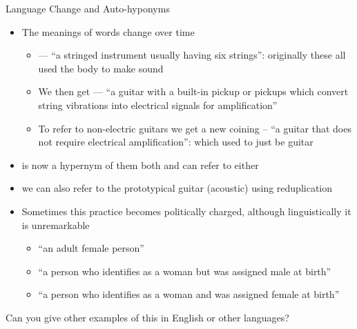 \begin{frame}[allowframebreaks]{Language Change and Auto-hyponyms}

\begin{itemize}%
\item The meanings of words change over time
  \begin{itemize}
  \item {} --- ``a stringed instrument usually having six
    strings'': originally these all used the body to make sound
    
\item We then get  --- ``a guitar with a built-in
  pickup or pickups which convert string vibrations into electrical
  signals for amplification''
\item To refer to non-electric guitars we get a new coining
   -- ``a guitar that does not require electrical
  amplification'': which used to just be guitar
\end{itemize}
  \item {} is now a hypernym of them both and can refer to
    either
 \item we can also refer to the prototypical guitar (acoustic) using
   reduplication
   \\   

\framebreak
  
\item Sometimes this practice becomes politically charged, although
  linguistically it is unremarkable
  \begin{itemize}
  \item {} ``an adult female person''
  \item {} ``a person who identifies as a woman but was assigned male at birth''
  \item {}  ``a person who identifies as a woman and was assigned female at birth''
  \end{itemize}
  \end{itemize}
  \begin{taskb}
    Can you give other examples of this in English or other languages?
  \end{taskb}


% 
\end{frame}

